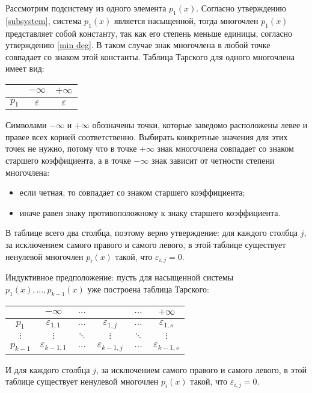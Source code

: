 Рассмотрим подсистему из одного элемента $p_1(x)$. Согласно утверждению \ref{subsystem}, система $p_1(x)$ является насыщенной, тогда многочлен $p_1(x)$ представляет собой константу, так как его степень меньше единицы, согласно утверждению \ref{min deg}. В таком случае знак многочлена в любой точке совпадает со знаком этой константы. Таблица Тарского для одного многочлена имеет вид:
\begin{center}
    \begin{tabular}{ |c|c|c| } 
    \hline
        & $-\infty$ & $+\infty$ \\ 
    \hline
        $p_1$ & $\varepsilon$ & $\varepsilon$\\ 
    \hline
    \end{tabular}
\end{center}
Символами $-\infty$ и $+\infty$ обозначены точки, которые заведомо расположены левее и правее всех корней соответственно. Выбирать конкретные значения для этих точек не нужно, потому что в точке $+\infty$ знак многочлена совпадает со знаком старшего коэффициента, а в точке $-\infty$ знак зависит от четности степени многочлена:
\begin{itemize}
    \item если четная, то совпадает со знаком старшего коэффициента;
    \item иначе равен знаку противоположному к знаку старшего коэффициента.
\end{itemize}
В таблице всего два столбца, поэтому верно утверждение: для каждого столбца $j$, за исключением самого правого и самого левого, в этой таблице существует ненулевой многочлен $p_i(x)$ такой, что $\varepsilon_{i, j} = 0$.

Индуктивное предположение: пусть для насыщенной системы $p_1(x), ... , p_{k-1}(x)$ уже построена таблица Тарского:
\begin{center}
    \begin{tabular}{ |c|c|c|c|c|c| } 
    \hline
                 & $-\infty$ & $...$ &  & $...$ & $+\infty$ \\ 
    \hline
        $p_1$ & $\varepsilon_{1, 1}$ & $...$ & $\varepsilon_{1, j}$ & $...$ & $\varepsilon_{1, s}$\\ 
    \hline
        $\vdots$ & $\vdots$ & $\ddots$ & $\vdots$ & $\ddots$ & $\vdots$ \\
    \hline
        $p_{k-1}$ & $\varepsilon_{k-1, 1}$ & $...$ & $\varepsilon_{k-1, j}$ & $...$ & $\varepsilon_{k-1, s}$\\    
    \hline
    \end{tabular}
\end{center}
И для каждого столбца $j$, за исключением самого правого и самого левого, в этой таблице существует ненулевой многочлен $p_i(x)$ такой, что $\varepsilon_{i, j} = 0$.

